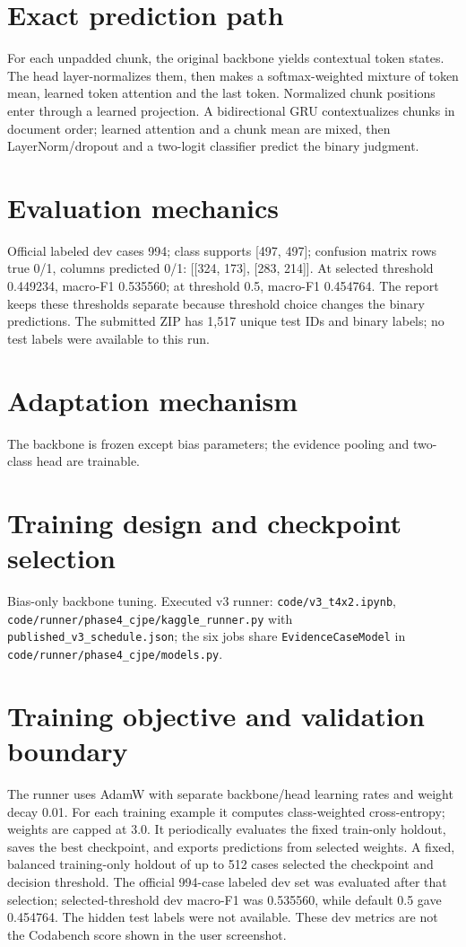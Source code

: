 \documentclass[11pt,a4paper]{article}
\begin{document}
\section{Exact prediction path}
For each unpadded chunk, the original backbone yields contextual token states. The head layer-normalizes them, then makes a softmax-weighted mixture of token mean, learned token attention and the last token. Normalized chunk positions enter through a learned projection. A bidirectional GRU contextualizes chunks in document order; learned attention and a chunk mean are mixed, then LayerNorm/dropout and a two-logit classifier predict the binary judgment.
\section{Evaluation mechanics}
Official labeled dev cases 994; class supports [497, 497]; confusion matrix rows true 0/1, columns predicted 0/1: [[324, 173], [283, 214]]. At selected threshold 0.449234, macro-F1 0.535560; at threshold 0.5, macro-F1 0.454764. The report keeps these thresholds separate because threshold choice changes the binary predictions. The submitted ZIP has 1,517 unique test IDs and binary labels; no test labels were available to this run.
\section{Adaptation mechanism}
The backbone is frozen except bias parameters; the evidence pooling and two-class head are trainable.
\section{Training design and checkpoint selection}
Bias-only backbone tuning. Executed v3 runner: \texttt{code/v3\_t4x2.ipynb}, \texttt{code/runner/phase4\_cjpe/kaggle\_runner.py} with \texttt{published\_v3\_schedule.json}; the six jobs share \texttt{EvidenceCaseModel} in \texttt{code/runner/phase4\_cjpe/models.py}.
\section{Training objective and validation boundary}
The runner uses AdamW with separate backbone/head learning rates and weight decay 0.01. For each training example it computes class-weighted cross-entropy; weights are capped at 3.0. It periodically evaluates the fixed train-only holdout, saves the best checkpoint, and exports predictions from selected weights. A fixed, balanced training-only holdout of up to 512 cases selected the checkpoint and decision threshold. The official 994-case labeled dev set was evaluated after that selection; selected-threshold dev macro-F1 was 0.535560, while default 0.5 gave 0.454764. The hidden test labels were not available. These dev metrics are not the Codabench score shown in the user screenshot.
\end{document}

